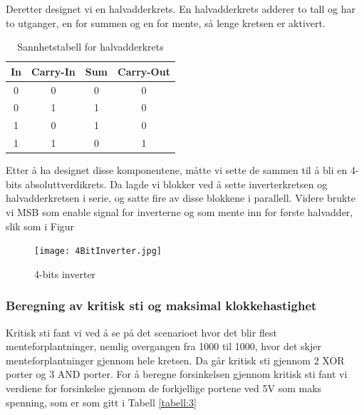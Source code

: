 
Deretter designet vi en halvadderkrets. En halvadderkrets adderer to tall og har to utganger, en for summen og en for mente, så lenge kretsen er aktivert.

\begin{table}[h]
  \centering
  \begin{tabular}{c c|c|c}

    In & Carry-In & Sum & Carry-Out\\
    \hline
    0 & 0 & 0 & 0\\
    0 & 1 & 1 & 0\\
    1 & 0 & 1 & 0\\
    1 & 1 & 0 & 1\\

  \end{tabular}
  \caption{Sannhetstabell for halvadderkrets}
  \label{tabell:2}
\end{table}


Etter å ha designet disse komponentene, måtte vi sette de sammen til å bli en 4-bits absoluttverdikrets.
Da lagde vi blokker ved å sette inverterkretsen og halvadderkretsen i serie, og satte fire av disse blokkene i parallell.
Videre brukte vi MSB som enable signal for inverterne og som mente inn for første halvadder, slik som i Figur

\begin{figure}[h]
  \texttt{[image: 4BitInverter.jpg]}
  \caption{4-bits inverter}
  \label{figur:1}
\end{figure}

\subsubsection*{Beregning av kritisk sti og maksimal klokkehastighet}

Kritisk sti fant vi ved å se på det scenarioet hvor det blir flest menteforplantninger, nemlig overgangen fra 1000 til 1000, hvor det skjer menteforplantninger gjennom hele kretsen.
Da går kritisk sti gjennom 2 XOR porter og 3 AND porter.
For å beregne forsinkelsen gjennom kritisk sti fant vi verdiene for forsinkelse gjennom de forkjellige portene ved 5V som maks spenning, som er som gitt i Tabell \ref{tabell:3}

